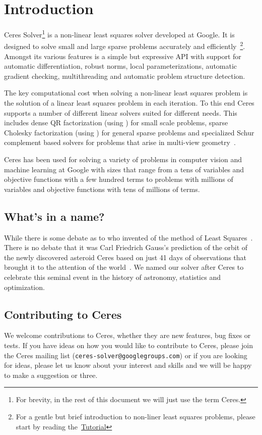 \chapter{Introduction}
\label{sec:introduction}
Ceres Solver\footnote{For brevity, in the rest of this document we will just use the term Ceres.} is a non-linear least squares solver developed at Google. It is designed to solve small and large sparse problems accurately and efficiently~\footnote{For a gentle but brief introduction to non-liner least squares problems, please start by reading the~\hyperref[chapter:tutorial]{Tutorial}}. Amongst its various features is a simple but expressive API with support for automatic differentiation, robust norms, local parameterizations, automatic gradient checking, multithreading and automatic problem structure detection.

The key computational cost when solving a non-linear least squares problem is the solution of a linear least squares problem in each iteration. To this end Ceres supports a number of different linear solvers suited for different needs. This includes dense QR factorization (using \eigen) for small scale problems, sparse Cholesky factorization (using \cholmod) for general sparse problems and specialized Schur complement based solvers for problems that arise in multi-view geometry~\cite{hartley-zisserman-book-2004}.

Ceres has been used for solving a variety of problems in computer vision and machine learning at Google with sizes that range from a tens of variables and objective functions with a few hundred terms to problems with millions of variables and objective functions with tens of millions of terms. 

\section{What's in a name?}
While there is some debate as to who invented of the method of Least Squares~\cite{stigler1981gauss}. There is no debate that it was Carl Friedrich Gauss's prediction of the orbit of the newly discovered asteroid Ceres based on just 41 days of observations that brought it to the attention of the world~\cite{tennenbaum-director}. We named our solver after Ceres to celebrate this seminal event in the history of astronomy, statistics and optimization.

\section{Contributing to Ceres}
We welcome contributions to Ceres, whether they are new features, bug fixes or tests. If you have ideas on how you would like to contribute to Ceres, please join the Ceres mailing list (\texttt{ceres-solver@googlegroups.com}) or if you are looking for ideas, please let us know about your interest and skills and we will be happy to make a suggestion or three.

